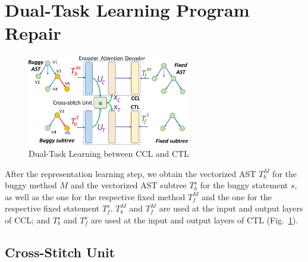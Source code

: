 \section{Dual-Task Learning Program Repair}
\label{sec: dual-learning}

\begin{figure}[t]
	\centering
	\includegraphics[width=2.8in]{graphs/dual-learning-repair-3.png}
        \vspace{-3pt}
	\caption{Dual-Task Learning between CCL and CTL}
	\label{fig:dual-learning}
\end{figure}

After the representation learning step, we obtain the vectorized AST
$T^{M}_b$ for the buggy method $M$ and the vectorized AST subtree
$T^{s}_b$ for the buggy statement $s$, as well as the one for the
respective fixed method $T^{M}_f$ and the one for the respective fixed
statement $T^{s}_f$. $T^{M}_b$ and $T^{M}_f$ are used at the input and
output layers of CCL; and $T^{s}_b$ and $T^{s}_f$ are used at the
input and output layers of CTL (Fig.~\ref{fig:dual-learning}).



\subsection{Cross-Stitch Unit}

